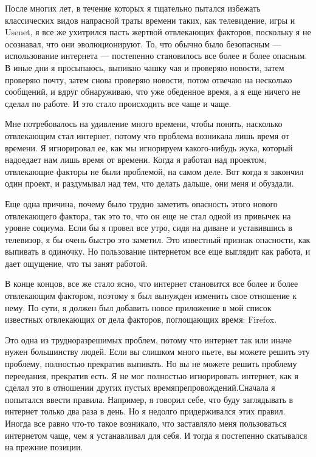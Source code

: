 \documentclass[ebook,12pt,oneside,openany]{memoir}
\begin{document}
После многих лет, в течение которых я тщательно пытался избежать
классических видов напрасной траты времени таких, как телевидение,
игры и Usenet, я все же ухитрился пасть жертвой отвлекающих факторов,
поскольку я не осознавал, что они эволюционируют. То, что обычно было
безопасным — использование интернета — постепенно становилось все
более и более опасным. В иные дни я просыпаюсь, выпиваю чашку чая и
проверяю новости, затем проверяю почту, затем снова проверяю новости,
потом отвечаю на несколько сообщений, и вдруг обнаруживаю, что уже
обеденное время, а я еще ничего не сделал по работе. И это стало
происходить все чаще и чаще.

Мне потребовалось на удивление много времени, чтобы понять, насколько
отвлекающим стал интернет, потому что проблема возникала лишь время от
времени. Я игнорировал ее, как мы игнорируем какого-нибудь жука,
который надоедает нам лишь время от времени. Когда я работал над
проектом, отвлекающие факторы не были проблемой, на самом деле. Вот
когда я закончил один проект, и раздумывал над тем, что делать дальше,
они меня и обуздали.

Еще одна причина, почему было трудно заметить опасность этого нового
отвлекающего фактора, так это то, что он еще не стал одной из привычек
на уровне социума. Если бы я провел все утро, сидя на диване и
уставившись в телевизор, я бы очень быстро это заметил. Это известный
признак опасности, как выпивать в одиночку. Но пользование интернетом
все еще выглядит как работа, и дает ощущение, что ты занят работой.

В конце концов, все же стало ясно, что интернет становится все более и
более отвлекающим фактором, поэтому я был вынужден изменить свое
отношение к нему. По сути, я должен был добавить новое приложение в
мой список известных отвлекающих от дела факторов, поглощающих время:
Firefox.

Это одна из трудноразрешимых проблем, потому что интернет так или
иначе нужен большинству людей. Если вы слишком много пьете, вы можете
решить эту проблему, полностью прекратив выпивать. Но вы не можете
решить проблему переедания, прекратив есть. Я не мог полностью
игнорировать интернет, как я сделал это в отношении других пустых
времяпрепровождений.Сначала я попытался ввести правила. Например, я
говорил себе, что буду заглядывать в интернет только два раза в день.
Но я недолго придерживался этих правил. Иногда все равно что-то такое
возникало, что заставляло меня пользоваться интернетом чаще, чем я
устанавливал для себя. И тогда я постепенно скатывался на прежние
позиции.
\end{document}
